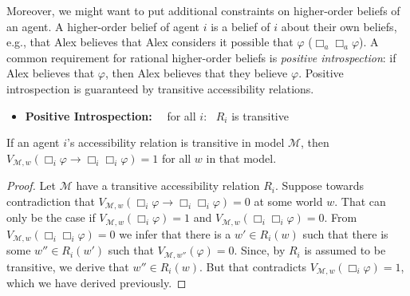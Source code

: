 \documentclass[nobib,nofonts]{tufte-handout}
\newcommand{\Model}{\ensuremath{\mathcal{M}}}
\begin{document}
Moreover, we might want to put additional constraints on higher-order beliefs of an agent.
A higher-order belief of agent $i$ is a belief of $i$ about their own beliefs, e.g., that Alex believes that Alex considers it possible that $\varphi$ ($\Box_{a}\Box_{a}\varphi$).
A common requirement for rational higher-order beliefs is \emph{positive introspection}: if Alex believes that $\varphi$, then Alex believes that they believe $\varphi$.
Positive introspection is guaranteed by transitive accessibility relations.
\begin{itemize}[]
  \item \textbf{Positive Introspection:} \ \  for all $i$: \ $R_{i}$ is transitive
\end{itemize}
\begin{claim}
 If an agent $i$'s accessibility relation is transitive in model $\Model$, then $V_{\Model,w}(\Box_{i}\varphi \rightarrow \Box_{i}\Box_{i}\varphi) = 1$ for all $w$ in that model.
\end{claim}
\begin{proof}
  Let $\Model$ have a transitive accessibility relation $R_{i}$.
  Suppose towards contradiction that $V_{\Model,w}(\Box_{i}\varphi \rightarrow \Box_{i}\Box_{i}\varphi) = 0$ at some world $w$.
  That can only be the case if $V_{\Model,w}(\Box_{i}\varphi) = 1$ and $V_{\Model,w}(\Box_{i}\Box_{i}\varphi) = 0$.
  From $V_{\Model,w}(\Box_{i}\Box_{i}\varphi) = 0$ we infer that there is a $w' \in R_{i}(w)$ such that there is some $w'' \in R_{i}(w')$ such that $V_{\Model, w''}(\varphi) = 0$.
  Since, by $R_{i}$ is assumed to be transitive, we derive that $w'' \in R_{i}(w)$.
  But that contradicts $V_{\Model,w}(\Box_{i}\varphi) = 1$, which we have derived previously.
\end{proof}
\end{document}
